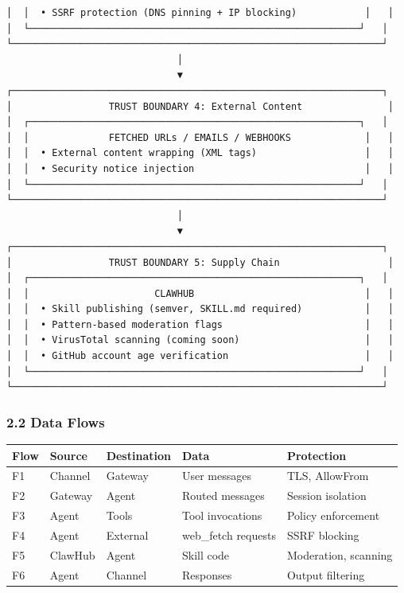 \begin{lstlisting}
│  │  • SSRF protection (DNS pinning + IP blocking)            │   │
│  └──────────────────────────────────────────────────────────┘   │
└─────────────────────────────────────────────────────────────────┘
                              │
                              ▼
┌─────────────────────────────────────────────────────────────────┐
│                 TRUST BOUNDARY 4: External Content               │
│  ┌──────────────────────────────────────────────────────────┐   │
│  │              FETCHED URLs / EMAILS / WEBHOOKS             │   │
│  │  • External content wrapping (XML tags)                   │   │
│  │  • Security notice injection                              │   │
│  └──────────────────────────────────────────────────────────┘   │
└─────────────────────────────────────────────────────────────────┘
                              │
                              ▼
┌─────────────────────────────────────────────────────────────────┐
│                 TRUST BOUNDARY 5: Supply Chain                   │
│  ┌──────────────────────────────────────────────────────────┐   │
│  │                      CLAWHUB                              │   │
│  │  • Skill publishing (semver, SKILL.md required)           │   │
│  │  • Pattern-based moderation flags                         │   │
│  │  • VirusTotal scanning (coming soon)                      │   │
│  │  • GitHub account age verification                        │   │
│  └──────────────────────────────────────────────────────────┘   │
└─────────────────────────────────────────────────────────────────┘
\end{lstlisting}


\subsubsection{2.2 Data Flows}



\begin{table}[h]
\centering
\small
\begin{tabular}{|l|l|l|l|l|}
\hline
Flow & Source & Destination & Data & Protection \\
\hline
F1 & Channel & Gateway & User messages & TLS, AllowFrom \\
\hline
F2 & Gateway & Agent & Routed messages & Session isolation \\
\hline
F3 & Agent & Tools & Tool invocations & Policy enforcement \\
\hline
F4 & Agent & External & web\_fetch requests & SSRF blocking \\
\hline
F5 & ClawHub & Agent & Skill code & Moderation, scanning \\
\hline
F6 & Agent & Channel & Responses & Output filtering \\
\hline
\end{tabular}
\end{table}



